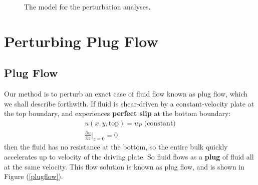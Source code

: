 \documentclass[12pt, a4paper, twoside, openright]{book}
\begin{document}
\begin{figure}[h]
\centering
{}
\caption{The model for the perturbation analyses.}\label{perturbmodel}
\end{figure}



\clearpage
\section{Perturbing Plug Flow}

\subsection{Plug Flow}

Our method is to perturb an exact case of fluid flow known as plug flow, which we shall describe forthwith.  If fluid is shear-driven by a constant-velocity plate at the top boundary, and experiences \textbf{perfect slip} at the bottom boundary:
\begin{gather}
u(x,y,\mathrm{top}) = u_P \text{  (constant)} \\
\frac{\partial u}{\partial z} \rvert_{z=0} = 0
\end{gather}
then the fluid has no resistance at the bottom, so the entire bulk quickly accelerates up to velocity of the driving plate.  So fluid flows as a \textbf{plug} of fluid all at the same velocity.  This flow solution is known as plug flow, and is shown in Figure (\ref{plugflow}).
\end{document}
